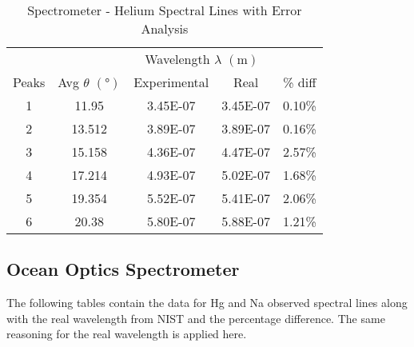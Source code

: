 \documentclass[12pt]{article}
\begin{document}
	\begin{table}[htbp]
		\centering
		\caption{Spectrometer - Helium Spectral Lines with Error Analysis}
		\begin{tabular}{ccccc}
			\toprule
			&   & \multicolumn{2}{c}{Wavelength $\lambda$ $(\unit{\meter})$} &  \\
			\cmidrule{3-4} Peaks & Avg $\theta$ $(\unit{\degree})$ & Experimental & Real & \% diff \\
			\midrule
			1 & 11.95 & 3.45E-07 & 3.45E-07 & 0.10\% \\
			2 & 13.512 & 3.89E-07 & 3.89E-07 & 0.16\% \\
			3 & 15.158 & 4.36E-07 & 4.47E-07 & 2.57\% \\
			4 & 17.214 & 4.93E-07 & 5.02E-07 & 1.68\% \\
			5 & 19.354 & 5.52E-07 & 5.41E-07 & 2.06\% \\
			6 & 20.38 & 5.80E-07 & 5.88E-07 & 1.21\% \\
			\bottomrule
		\end{tabular}%
		\label{tab:HeliumSpectralLineswithErrorAnalysis}%
	\end{table}%
	
	
	
\clearpage
	
	\subsection{Ocean Optics Spectrometer}
	
	The following tables contain the data for Hg and Na observed spectral lines along with the real wavelength from NIST and the percentage difference. The same reasoning for the real wavelength is applied here.
	
	
\end{document}
